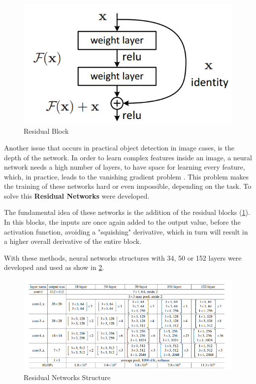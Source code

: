  \begin{figure}[H]
	\includegraphics[width=\textwidth]{Pictures/007SkipConnection.png}
	\caption{Residual Block \cite{ResNetPaper}}
	\label{SkipConnection}
\end{figure}

Another issue that occurs in practical object detection in image cases, is the depth of the network. In order to learn complex features inside an image, a neural network needs a high number of layers, to have space for learning every feature, which, in practice, leads to the vanishing gradient problem \cite{ResNetPaper}. This problem makes the training of these networks hard or even impossible, depending on the task. To solve this \textbf{Residual Networks} \cite{ResNetPaper} were developed.

The fundamental idea of these networks is the addition of the residual blocks (\ref{SkipConnection}). In this blocks, the inputs are once again added to the output value, before the activation function, avoiding a "squishing" derivative, which in turn will result in a higher overall derivative of the entire block.

With these methods, neural networks structures with 34, 50 or 152 layers were developed and used as show in \ref{ResNetExample}.

 \begin{figure}[H]
	\includegraphics[width=\textwidth]{Pictures/008ResNetExample.png}
	\caption{Residual Networks Structure \cite{ResNetPaper}}
	\label{ResNetExample}
\end{figure}

